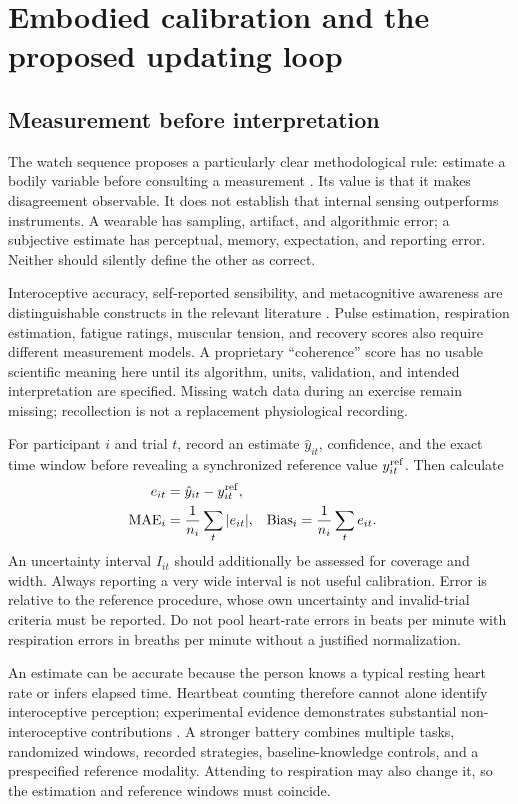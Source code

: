 \section{Embodied calibration and the proposed updating loop}
\subsection{Measurement before interpretation}
The watch sequence proposes a particularly clear methodological rule: estimate a bodily variable before consulting a measurement . Its value is that it makes disagreement observable. It does not establish that internal sensing outperforms instruments. A wearable has sampling, artifact, and algorithmic error; a subjective estimate has perceptual, memory, expectation, and reporting error. Neither should silently define the other as correct.

Interoceptive accuracy, self-reported sensibility, and metacognitive awareness are distinguishable constructs in the relevant literature \cite{garfinkel}. Pulse estimation, respiration estimation, fatigue ratings, muscular tension, and recovery scores also require different measurement models. A proprietary ``coherence'' score has no usable scientific meaning here until its algorithm, units, validation, and intended interpretation are specified. Missing watch data during an exercise remain missing; recollection is not a replacement physiological recording.

For participant $i$ and trial $t$, record an estimate $\hat y_{it}$, confidence, and the exact time window before revealing a synchronized reference value $y^{\rm ref}_{it}$. Then calculate
\begin{align}
 e_{it}&=\hat y_{it}-y^{\rm ref}_{it},\\
 \operatorname{MAE}_i&=\frac{1}{n_i}\sum_t|e_{it}|,
 &\operatorname{Bias}_i&=\frac{1}{n_i}\sum_t e_{it}.
\end{align}
An uncertainty interval $I_{it}$ should additionally be assessed for coverage and width. Always reporting a very wide interval is not useful calibration. Error is relative to the reference procedure, whose own uncertainty and invalid-trial criteria must be reported. Do not pool heart-rate errors in beats per minute with respiration errors in breaths per minute without a justified normalization.

An estimate can be accurate because the person knows a typical resting heart rate or infers elapsed time. Heartbeat counting therefore cannot alone identify interoceptive perception; experimental evidence demonstrates substantial non-interoceptive contributions \cite{desmedt}. A stronger battery combines multiple tasks, randomized windows, recorded strategies, baseline-knowledge controls, and a prespecified reference modality. Attending to respiration may also change it, so the estimation and reference windows must coincide.

